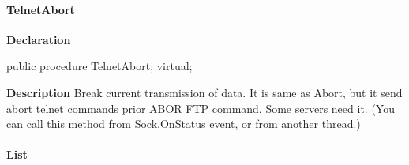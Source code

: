 \documentclass{report}
\newif\ifpdf
\begin{document}
\paragraph*{TelnetAbort}\hspace*{\fill}

\label{ftpsend.TFTPSend-TelnetAbort}
\begin{list}{}{
\setlength{\itemindent}{0cm}
\setlength{\listparindent}{0cm}
\setlength{\leftmargin}{\evensidemargin}
\addtolength{\leftmargin}{\tmplength}
\settowidth{\labelsep}{X}
\addtolength{\leftmargin}{\labelsep}
\setlength{\labelwidth}{\tmplength}
}
\item[\textbf{Declaration}\hfill]
\ifpdf
\begin{flushleft}
\fi
\begin{ttfamily}
public procedure TelnetAbort; virtual;\end{ttfamily}

\ifpdf
\end{flushleft}
\fi

\par
\item[\textbf{Description}]
Break current transmission of data. It is same as Abort, but it send abort telnet commands prior ABOR FTP command. Some servers need it. (You can call this method from Sock.OnStatus event, or from another thread.)

\end{list}
\paragraph*{List}\hspace*{\fill}
\end{document}
